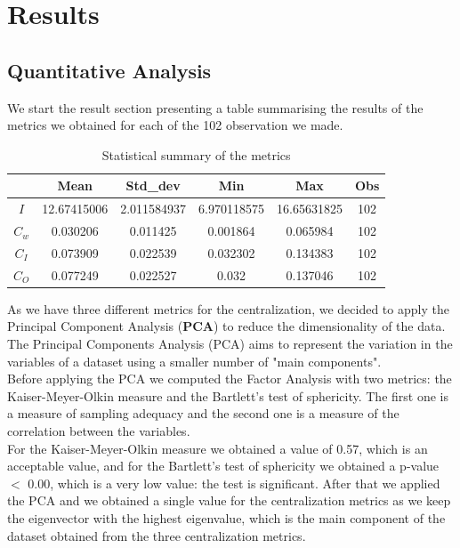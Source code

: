 \documentclass[12pt, a4paper]{article}
\begin{document}
\section{Results}
\subsection{Quantitative Analysis}
\label{quantitative-analysis}
We start the result section presenting a table summarising the results of the metrics we obtained for each of the 102 observation we made. \\
\begin{table}[H]
        \centering
        \begin{tabular}{|c|c|c|c|c|c|}
                \hline
                & \textbf{Mean} & \textbf{Std\_dev} & \textbf{Min} & \textbf{Max} &   \textbf{Obs} \\
                \hline
                \textbf{$I$}  &  12.67415006 & 2.011584937 & 6.970118575 &16.65631825 &  102 \\
                \hline
                \textbf{$C_w$}  &  0.030206  &  0.011425 & 0.001864 & 0.065984 & 102 \\
                \hline
                \textbf{$C_I$} & 0.073909 & 0.022539 & 0.032302 & 0.134383 & 102 \\
                \hline
                \textbf{$C_O$} & 0.077249 & 0.022527 & 0.032 & 0.137046 & 102 \\
                \hline
        \end{tabular}
        \caption{Statistical summary of the metrics}
\end{table}
As we have three different metrics for the centralization, we decided to apply the Principal Component Analysis (\textbf{PCA}) to reduce the dimensionality of the data. The Principal Components Analysis (PCA) aims to represent the variation in the variables of a dataset using a smaller number of "main components".\\
Before applying the PCA we computed the Factor Analysis with two metrics: the Kaiser-Meyer-Olkin measure and the Bartlett's test of sphericity. The first one is a measure of sampling adequacy and the second one is a measure of the correlation between the variables. \\
For the Kaiser-Meyer-Olkin measure we obtained a value of 0.57, which is an acceptable value, and for the Bartlett's test of sphericity we obtained a p-value $<$ 0.00, which is a very low value: the test is significant.
After that we applied the PCA and we obtained a single value for the centralization metrics as we keep the eigenvector with the highest eigenvalue, which is the main component of the dataset obtained from the three centralization metrics. \\
\end{document}
